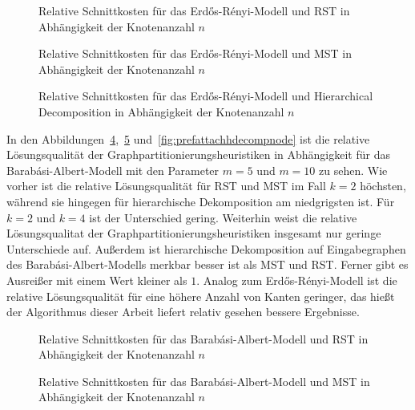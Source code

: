 \begin{figure}[H]
    \centering
    
    \caption{Relative Schnittkosten für das Erdős-Rényi-Modell und RST in Abhängigkeit der Knotenanzahl $n$\label{fig:edgeprobrstnode}}
\end{figure}

\begin{figure}[H]
    \centering
    
    \caption{Relative Schnittkosten für das Erdős-Rényi-Modell und MST in Abhängigkeit der Knotenanzahl $n$\label{fig:edgeprobmstnode}}
\end{figure}

\begin{figure}[H]
    \centering
    
    \caption{Relative Schnittkosten für das Erdős-Rényi-Modell und Hierarchical Decomposition in Abhängigkeit der Knotenanzahl $n$\label{fig:edgeprobhdecompnode}}
\end{figure}


In den Abbildungen~\ref{fig:prefattachrstnode},~\ref{fig:prefattachmstnode} und~\ref{fig:prefattachhdecompnode} ist die relative Lösungsqualität der Graphpartitionierungsheuristiken in Abhängigkeit für das Barabási-Albert-Modell mit den Parameter $m=5$ und $m=10$ zu sehen.
Wie vorher ist die relative Lösungsqualität für RST und MST im Fall $k=2$ höchsten, während sie hingegen für hierarchische Dekomposition am niedgrigsten ist.
Für $k=2$ und $k=4$ ist der Unterschied gering.
Weiterhin weist die relative Lösungsqualitat der Graphpartitionierungsheuristiken insgesamt nur geringe Unterschiede auf.
Außerdem ist hierarchische Dekomposition auf Eingabegraphen des Barabási-Albert-Modells merkbar besser ist als MST und RST.
Ferner gibt es Ausreißer mit einem Wert kleiner als $1$.
Analog zum Erdős-Rényi-Modell ist die relative Lösungsqualität für eine höhere Anzahl von Kanten geringer, das hießt der Algorithmus dieser Arbeit liefert relativ gesehen bessere Ergebnisse.

\begin{figure}[H]
    \centering
    
    \caption{Relative Schnittkosten für das Barabási-Albert-Modell und RST in Abhängigkeit der Knotenanzahl $n$\label{fig:prefattachrstnode}}
\end{figure}

\begin{figure}[H]
    \centering
    
    \caption{Relative Schnittkosten für das Barabási-Albert-Modell und MST in Abhängigkeit der Knotenanzahl $n$\label{fig:prefattachmstnode}}
\end{figure}

